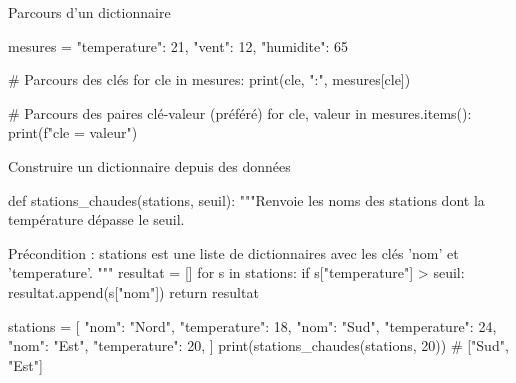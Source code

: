 \begin{codereference}{Parcours d'un dictionnaire}
\begin{python}
mesures = {"temperature": 21, "vent": 12, "humidite": 65}

# Parcours des clés
for cle in mesures:
    print(cle, ":", mesures[cle])

# Parcours des paires clé-valeur (préféré)
for cle, valeur in mesures.items():
    print(f"{cle} = {valeur}")
\end{python}
\end{codereference}


\begin{codereference}{Construire un dictionnaire depuis des données}
\begin{python}
def stations_chaudes(stations, seuil):
    """Renvoie les noms des stations dont la température
    dépasse le seuil.

    Précondition : stations est une liste de dictionnaires
    avec les clés 'nom' et 'temperature'.
    """
    resultat = []
    for s in stations:
        if s["temperature"] > seuil:
            resultat.append(s["nom"])
    return resultat

stations = [
    {"nom": "Nord", "temperature": 18},
    {"nom": "Sud", "temperature": 24},
    {"nom": "Est", "temperature": 20},
]
print(stations_chaudes(stations, 20))  # ["Sud", "Est"]
\end{python}
\end{codereference}



